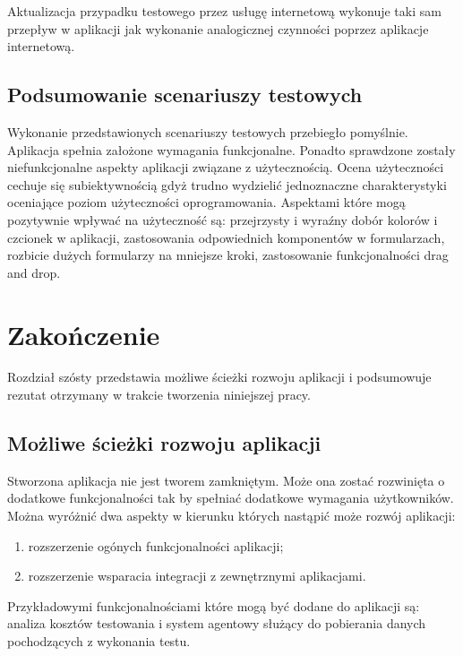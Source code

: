 Aktualizacja przypadku testowego przez usługę internetową wykonuje taki sam przepływ w aplikacji jak wykonanie analogicznej czynności poprzez aplikacje internetową.

\section{Podsumowanie scenariuszy testowych}

Wykonanie przedstawionych scenariuszy testowych przebiegło pomyślnie. Aplikacja spełnia założone wymagania funkcjonalne. Ponadto sprawdzone zostały niefunkcjonalne aspekty aplikacji związane z użytecznością. Ocena użyteczności cechuje się subiektywnością gdyż trudno wydzielić jednoznaczne charakterystyki oceniające poziom użyteczności oprogramowania. Aspektami które mogą pozytywnie wpływać na użyteczność są: przejrzysty i wyraźny dobór kolorów i czcionek w aplikacji, zastosowania odpowiednich komponentów w formularzach, rozbicie dużych formularzy na mniejsze kroki, zastosowanie funkcjonalności drag and drop.



\chapter{Zakończenie}

Rozdział szósty przedstawia możliwe ścieżki rozwoju aplikacji i podsumowuje rezutat otrzymany w trakcie tworzenia niniejszej pracy.

\section{Możliwe ścieżki rozwoju aplikacji}

Stworzona aplikacja nie jest tworem zamkniętym. Może ona zostać rozwinięta o dodatkowe funkcjonalności tak by spełniać dodatkowe wymagania użytkowników. Można wyróżnić dwa aspekty w kierunku których nastąpić może rozwój aplikacji:
\begin{enumerate}
  \item rozszerzenie ogónych funkcjonalności aplikacji;
  \item rozszerzenie wsparacia integracji z zewnętrznymi aplikacjami.
\end{enumerate}

Przykładowymi funkcjonalnościami które mogą być dodane do aplikacji są: analiza kosztów testowania i system agentowy służący do pobierania danych pochodzących z wykonania testu.

